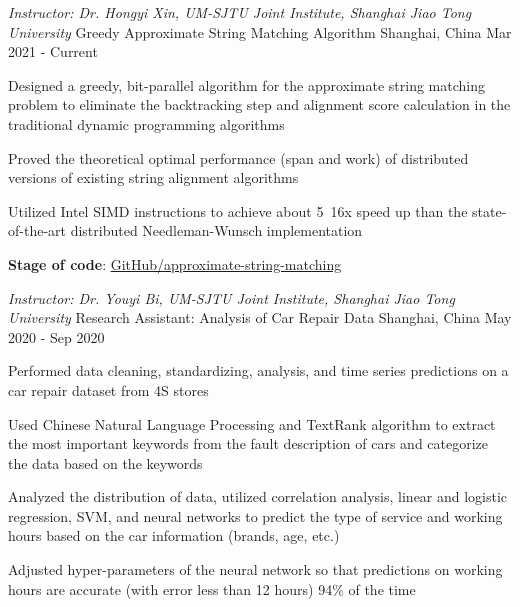 \begin{cventries}

\cventry
    {\it Instructor: Dr. Hongyi Xin, UM-SJTU Joint Institute, Shanghai Jiao Tong University} %
    {Greedy Approximate String Matching Algorithm} %
    {Shanghai, China} %
    {Mar 2021 - Current} %
    {
      \begin{cvitems} %
        \item {Designed a greedy, bit-parallel algorithm for the approximate string matching problem to eliminate the backtracking step and alignment score calculation in the traditional dynamic programming algorithms}
    \item {Proved the theoretical optimal performance (span and work) of distributed versions of existing string alignment algorithms}
    \item {Utilized Intel SIMD instructions to achieve about 5~16x speed up than the state-of-the-art distributed Needleman-Wunsch implementation}
    \item {\textbf{Stage of code}: \href{https://github.com/GZHoffie/approximate-string-matching}{GitHub/approximate-string-matching}}
      \end{cvitems}
    }


\cventry
    {\it Instructor: Dr. Youyi Bi, UM-SJTU Joint Institute, Shanghai Jiao Tong University} %
    {Research Assistant: Analysis of Car Repair Data} %
    {Shanghai, China} %
    {May 2020 - Sep 2020} %
    {
      \begin{cvitems} %
        \item {Performed data cleaning, standardizing, analysis, and time series predictions on a car repair dataset from 4S stores}
    \item {Used Chinese Natural Language Processing and TextRank algorithm to extract the most important keywords from the fault description of cars and categorize the data based on the keywords}
    \item {Analyzed the distribution of data, utilized correlation analysis, linear and logistic regression, SVM, and neural networks to predict the type of service and working hours based on the car information (brands, age, etc.)}
    \item {Adjusted hyper-parameters of the neural network so that predictions on working hours are accurate (with error less than 12 hours) 94\% of the time}
      \end{cvitems}
    }


\end{cventries}
